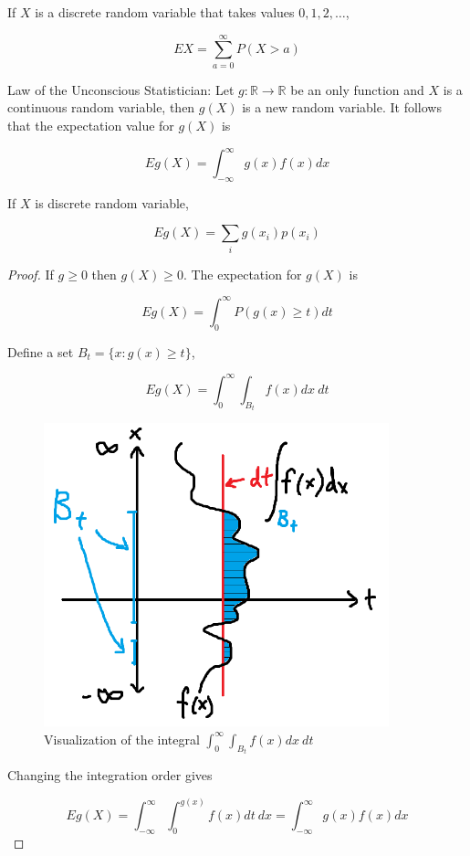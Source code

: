 If $X$ is a discrete random variable that takes values $0, 1, 2, \dots$,

\[ EX=\sum_{a=0}^\infty P(X>a) \]

\begin{theorem}
	Law of the Unconscious Statistician: Let $g : \mathbb{R} \to \mathbb{R}$ be an only function and $X$ is a continuous random variable, then $g(X)$ is a new random variable. It follows that the expectation value for $g(X)$ is
	
	\[ Eg(X)=\int_{-\infty}^\infty g(x) f(x) dx \]
	
	If $X$ is discrete random variable,
	
	\[ Eg(X)=\sum_i g(x_i) p(x_i) \]
\end{theorem}

\begin{proof}
	If $g \ge 0$ then $g(X)\ge0$. The expectation for $g(X)$ is
	
	\[ Eg(X)=\int_0^\infty P(g(x)\ge t) dt \]
	
	Define a set $B_t=\{ x : g(x)\ge t \}$,
	
	\[ Eg(X)=\int_0^\infty \int_{B_t} f(x) dx \: dt \]
	
	\begin{figure}[H]
		\centering
		\includegraphics[width=100mm]{20.png}
		\caption{Visualization of the integral $\displaystyle\int_0^\infty \int_{B_t} f(x) dx \: dt$}
	\end{figure}
	
	Changing the integration order gives
	
	\[ Eg(X)=\int_{-\infty}^\infty \int_0^{g(x)} f(x) dt \: dx = \int_{-\infty}^\infty g(x) f(x) dx \]
\end{proof}

